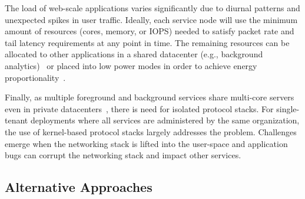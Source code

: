  The load of web-scale applications
varies significantly due to diurnal patterns and unexpected spikes in
user traffic. Ideally, each service node will use the minimum amount
of resources (cores, memory, or IOPS) needed to satisfy packet rate
and tail latency requirements at any point in time. The remaining
resources can be allocated to other applications in a shared
datacenter (e.g., background
analytics)~\cite{Hindman:2011:MPF,DBLP:conf/asplos/DelimitrouK14,Leverich:RHSU:2014}
or placed into low power modes in order to achieve energy
proportionality~\cite{DBLP:journals/computer/BarrosoH07, Lo:2014:TWE}.


 Finally, as multiple foreground and
background services share multi-core servers even in private
datacenters~\cite{Schwarzkopf:2013:OFS,DBLP:journals/cacm/DeanB13},
there is need for isolated protocol stacks. For single-tenant
deployments where all services are administered by the same
organization, the use of kernel-based protocol stacks largely
addresses the problem.  Challenges emerge when the networking stack is
lifted into the user-space and application bugs can corrupt the
networking stack and impact other services.


\subsection{Alternative Approaches}
\label{sec:motivation:current}

